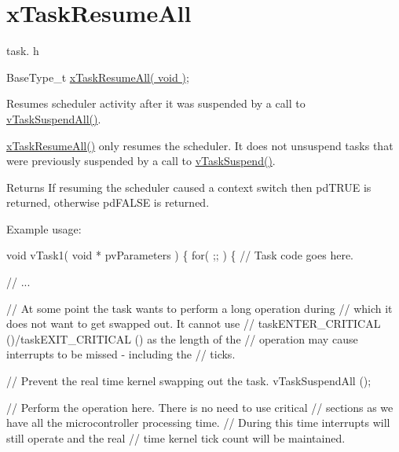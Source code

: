 \hypertarget{group__xTaskResumeAll}{}\section{x\+Task\+Resume\+All}
\label{group__xTaskResumeAll}
task. h 
\begin{DoxyPre}BaseType\_t \hyperlink{task_8h_a003f8ae6d649225abd030cc76e1c7d0e}{xTaskResumeAll( void )};\end{DoxyPre}


Resumes scheduler activity after it was suspended by a call to \hyperlink{task_8h_a366b302eba79d10b5ee2a3756f0fcc43}{v\+Task\+Suspend\+All()}.

\hyperlink{task_8h_a003f8ae6d649225abd030cc76e1c7d0e}{x\+Task\+Resume\+All()} only resumes the scheduler. It does not unsuspend tasks that were previously suspended by a call to \hyperlink{task_8h_a84d4e660b04630be2939d91b3c2412f8}{v\+Task\+Suspend()}.

\begin{DoxyReturn}{Returns}
If resuming the scheduler caused a context switch then pd\+T\+R\+UE is returned, otherwise pd\+F\+A\+L\+SE is returned.
\end{DoxyReturn}
Example usage\+: 
\begin{DoxyPre}
void vTask1( void * pvParameters )
\{
    for( ;; )
    \{
     // Task code goes here.\end{DoxyPre}



\begin{DoxyPre}     // ...\end{DoxyPre}



\begin{DoxyPre}     // At some point the task wants to perform a long operation during
     // which it does not want to get swapped out.  It cannot use
     // taskENTER\_CRITICAL ()/taskEXIT\_CRITICAL () as the length of the
     // operation may cause interrupts to be missed - including the
     // ticks.\end{DoxyPre}



\begin{DoxyPre}     // Prevent the real time kernel swapping out the task.
     vTaskSuspendAll ();\end{DoxyPre}



\begin{DoxyPre}     // Perform the operation here.  There is no need to use critical
     // sections as we have all the microcontroller processing time.
     // During this time interrupts will still operate and the real
     // time kernel tick count will be maintained.\end{DoxyPre}




